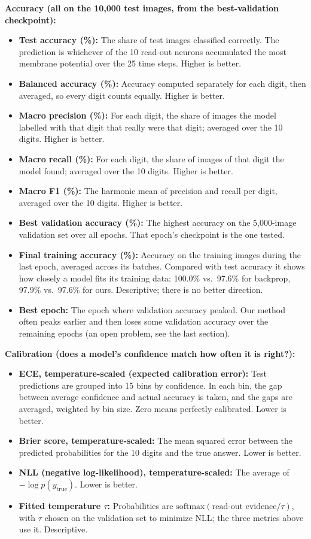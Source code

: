 \documentclass{article}
\begin{document}
{\small
\noindent\textbf{Accuracy (all on the 10,000 test images, from the best-validation checkpoint):}
\begin{itemize}
  \item \textbf{Test accuracy (\%):} The share of test images classified correctly. The prediction is whichever
    of the 10 read-out neurons accumulated the most membrane potential over the 25 time steps. Higher is better.
  \item \textbf{Balanced accuracy (\%):} Accuracy computed separately for each digit, then averaged, so every
    digit counts equally. Higher is better.
  \item \textbf{Macro precision (\%):} For each digit, the share of images the model labelled with that digit that
    really were that digit; averaged over the 10 digits. Higher is better.
  \item \textbf{Macro recall (\%):} For each digit, the share of images of that digit the model found; averaged
    over the 10 digits. Higher is better.
  \item \textbf{Macro F1 (\%):} The harmonic mean of precision and recall per digit, averaged over the 10 digits.
    Higher is better.
  \item \textbf{Best validation accuracy (\%):} The highest accuracy on the 5,000-image validation set over all
    epochs. That epoch's checkpoint is the one tested.
  \item \textbf{Final training accuracy (\%):} Accuracy on the training images during the last epoch, averaged
    across its batches. Compared with test accuracy it shows how closely a model fits its training data: 100.0\%
    vs.\ 97.6\% for backprop, 97.9\% vs.\ 97.6\% for ours. Descriptive; there is no better direction.
  \item \textbf{Best epoch:} The epoch where validation accuracy peaked. Our method often peaks earlier and then
    loses some validation accuracy over the remaining epochs (an open problem, see the last section).
\end{itemize}

\noindent\textbf{Calibration (does a model's confidence match how often it is right?):}
\begin{itemize}
  \item \textbf{ECE, temperature-scaled (expected calibration error):} Test predictions are grouped into 15 bins
    by confidence. In each bin, the gap between average confidence and actual accuracy is taken, and the gaps are
    averaged, weighted by bin size. Zero means perfectly calibrated. Lower is better.
  \item \textbf{Brier score, temperature-scaled:} The mean squared error between the predicted probabilities for
    the 10 digits and the true answer. Lower is better.
  \item \textbf{NLL (negative log-likelihood), temperature-scaled:} The average of $-\log p(y_{\mathrm{true}})$.
    Lower is better.
  \item \textbf{Fitted temperature $\tau$:} Probabilities are $\mathrm{softmax}(\text{read-out evidence}/\tau)$,
    with $\tau$ chosen on the validation set to minimize NLL; the three metrics above use it. Descriptive.
\end{itemize}

}
\end{document}
